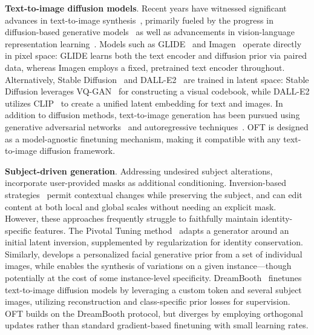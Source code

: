 \textbf{Text-to-image diffusion models}. Recent years have witnessed significant advances in text-to-image synthesis~\cite{saharia2022photorealistic,ramesh2022hierarchical,rombach2022high,gu2022vector,nichol2022glide}, primarily fueled by the progress in diffusion-based generative models~\cite{ho2020denoising,song2021score,song2021denoising,dhariwal2021diffusion} as well as advancements in vision-language representation learning~\cite{su2020vlbert,lu2019vilbert,radford2021learning,wang2021simvlm,li2022blip,li2023blip,alayrac2022flamingo,schuhmann2022laion}. Models such as GLIDE~\cite{nichol2022glide} and Imagen~\cite{saharia2022photorealistic} operate directly in pixel space: GLIDE learns both the text encoder and diffusion prior via paired data, whereas Imagen employs a fixed, pretrained text encoder throughout. Alternatively, Stable Diffusion~\cite{rombach2022high} and DALL-E2~\cite{ramesh2022hierarchical} are trained in latent space: Stable Diffusion leverages VQ-GAN~\cite{esser2021taming} for constructing a visual codebook, while DALL-E2 utilizes CLIP~\cite{radford2021learning} to create a unified latent embedding for text and images. In addition to diffusion methods, text-to-image generation has been pursued using generative adversarial networks~\cite{reed2016generative,zhang2017stackgan,xu2018attngan,li2019controllable} and autoregressive techniques~\cite{ramesh2021zero,ding2021cogview,wu2022nuwa,yuscaling}. OFT is designed as a model-agnostic finetuning mechanism, making it compatible with any text-to-image diffusion framework.

\textbf{Subject-driven generation}. Addressing undesired subject alterations, \cite{avrahami2022blended,nichol2022glide} incorporate user-provided masks as additional conditioning. Inversion-based strategies~\cite{choi2021ilvr,dhariwal2021diffusion,ramesh2022hierarchical,gal2022image} permit contextual changes while preserving the subject, and \cite{hertz2022prompt} can edit content at both local and global scales without needing an explicit mask. However, these approaches frequently struggle to faithfully maintain identity-specific features. The Pivotal Tuning method~\cite{roich2022pivotal} adapts a generator around an initial latent inversion, supplemented by regularization for identity conservation. Similarly, \cite{nitzan2022mystyle} develops a personalized facial generative prior from a set of individual images, while \cite{casanova2021instance} enables the synthesis of variations on a given instance—though potentially at the cost of some instance-level specificity. DreamBooth~\cite{ruiz2023dreambooth} finetunes text-to-image diffusion models by leveraging a custom token and several subject images, utilizing reconstruction and class-specific prior losses for supervision. OFT builds on the DreamBooth protocol, but diverges by employing orthogonal updates rather than standard gradient-based finetuning with small learning rates.

